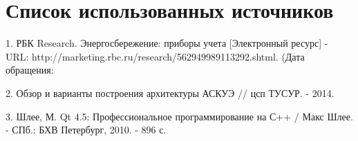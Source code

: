 


 
 
 
 \newpage
 \tableofcontents
 
 
 
 
 
 \newpage
 
 
 
 \newpage
 \section*{Список использованных источников}
 1. РБК Research. Энергосбережение: приборы учета [Электронный ресурс] - URL: http://marketing.rbc.ru/research/562949989113292.shtml. (Дата обращения: 
 
 2. Обзор и варианты построения архитектуры АСКУЭ // цсп ТУСУР. - 2014.
 
 3. Шлее, М. Qt 4.5: Профессиональное программирование на С++ / Макс Шлее. - СПб.: БХВ Петербург, 2010. - 896 с.



